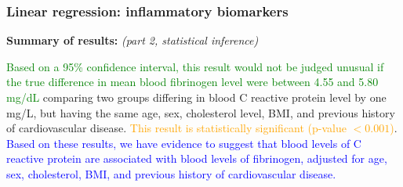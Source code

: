 \documentclass[12pt, 
hyperref={colorlinks=true, linkcolor=blue, urlcolor=cyan},dvipsnames]{beamer}
\begin{document}
\begin{frame}
\frametitle{Linear regression: inflammatory biomarkers}

\textbf{Summary of results:} \textit{(part 2, statistical inference)}

\textcolor{green}{Based on a 95\% confidence interval, this result would not be judged unusual if the true difference in mean blood fibrinogen level were between 4.55 and 5.80 mg/dL} comparing two groups differing in blood C reactive protein level by one mg/L, but having the same age, sex, cholesterol level, BMI, and previous history of cardiovascular disease. \textcolor{orange}{This result is statistically significant (p-value $< 0.001$)}. \textcolor{blue}{Based on these results, we have evidence to suggest that blood levels of C reactive protein are associated with blood levels of fibrinogen, adjusted for age, sex, cholesterol, BMI, and previous history of cardiovascular disease.}
\end{frame}
\end{document}
